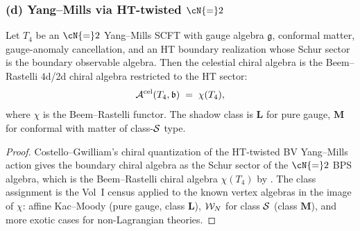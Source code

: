 \subsubsection*{(d) Yang--Mills via HT-twisted $\cN{=}2$}

\begin{proposition}
\label{prop:uch-ym}
Let $T_4$ be an $\cN{=}2$ Yang--Mills SCFT with gauge algebra
$\mathfrak g$, conformal matter, gauge-anomaly cancellation, and an
HT boundary realization whose Schur sector is the boundary observable
algebra. Then the celestial chiral algebra is the Beem--Rastelli
$4$d/2d chiral algebra
\cite{BeemRastelliChiralAlgebras4d,BLLRvR15} restricted to the HT
sector:
\[
\mathcal A^{\mathrm{cel}}(T_4,\mathfrak b) \;=\; \chi(T_4),
\]
where $\chi$ is the Beem--Rastelli functor. The shadow class is
$\mathbf L$ for pure gauge, $\mathbf M$ for conformal with matter of
class-$\mathcal S$ type.
\end{proposition}

\begin{proof}
Costello--Gwilliam's chiral quantization of the HT-twisted BV
Yang--Mills action gives the boundary chiral algebra as the Schur
sector of the $\cN{=}2$ BPS algebra, which is the Beem--Rastelli
chiral algebra $\chi(T_4)$ by
\cite[\S 4]{PaquetteWilliamsHT}. The class assignment is the Vol~I
census applied to the known vertex algebras in the image of $\chi$:
affine Kac--Moody (pure gauge, class $\mathbf L$), $\mathcal W_N$ for class
$\mathcal S$ (class $\mathbf M$), and more exotic cases for non-Lagrangian
theories.
\end{proof}


